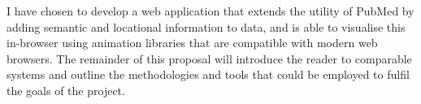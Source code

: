 \documentclass[PROP_AGutteridge_CS.tex]{subfiles}
\begin{document}
\noindent I have chosen to develop a web application that extends the utility of PubMed by adding semantic and locational information to data, and is able to visualise this in-browser using animation libraries that are compatible with modern web browsers. The remainder of this proposal will introduce the reader to comparable systems and outline the methodologies and tools that could be employed to fulfil the goals of the project.
\end{document}
